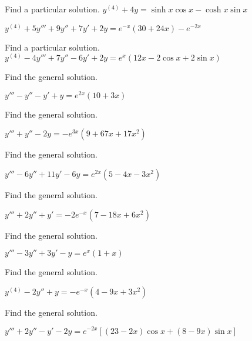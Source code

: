\documentclass{ximera}
\begin{document}
\begin{problem}\label{exer:9.3.57}   Find a particular solution.   $y^{(4)}+4y=\sinh x\cos x-\cosh x\sin x$
\end{problem}

\begin{problem}\label{exer:9.3.58}
$y^{(4)}+5y'''+9y''+7y'+2y=e^{-x}(30+24x)-e^{-2x}$
\end{problem}

\begin{problem}\label{exer:9.3.59}   Find a particular solution.   $y^{(4)}-4y'''+7y''-6y'+2y=e^x(12x-2\cos
x+2\sin x)$
\end{problem}

\begin{problem}\label{exer:9.3.60}   Find the general solution.

$y'''-y''-y'+y=e^{2x}(10+3x)$
\end{problem}

\begin{problem}\label{exer:9.3.61}   Find the general solution. 

$y'''+y''-2y=-e^{3x}(9+67x+17x^2)$
\end{problem}

\begin{problem}\label{exer:9.3.62}   Find the general solution.

$y'''-6y''+11y'-6y=e^{2x}(5-4x-3x^2)$
\end{problem}

\begin{problem}\label{exer:9.3.63}   Find the general solution. 

$y'''+2y''+y'=-2e^{-x}(7-18x+6x^2)$
\end{problem}

\begin{problem}\label{exer:9.3.64}   Find the general solution. 

$y'''-3y''+3y'-y=e^x(1+x)$
\end{problem}

\begin{problem}\label{exer:9.3.65}  Find the general solution.

$y^{(4)}-2y''+y=-e^{-x}(4-9x+3x^2)$
\end{problem}

\begin{problem}\label{exer:9.3.66}   Find the general solution. 

$y'''+2y''-y'-2y=e^{-2x}\left[(23-2x)\cos
x+(8-9x)\sin x\right]$
\end{problem}
\end{document}
